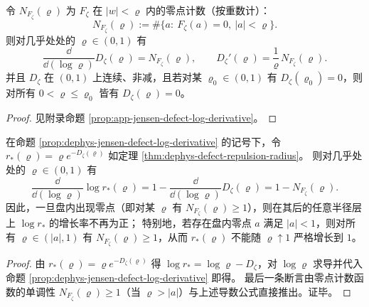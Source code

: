 \begin{proposition}\label{prop:dephys-jensen-defect-log-derivative}
令 \(N_{F_{\zeta}}(\varrho)\) 为 \(F_{\zeta}\) 在 \(|w|<\varrho\) 内的零点计数（按重数计）：
\[
N_{F_{\zeta}}(\varrho)
:=\#\bigl\{a:\ F_{\zeta}(a)=0,\ |a|<\varrho\bigr\}.
\]
则对几乎处处的 \(\varrho\in(0,1)\) 有
\[
\frac{\dd}{\dd(\log\varrho)}D_{\zeta}(\varrho)=N_{F_{\zeta}}(\varrho),
\qquad
D_{\zeta}'(\varrho)=\frac{1}{\varrho}\,N_{F_{\zeta}}(\varrho).
\]
并且 \(D_{\zeta}\) 在 \((0,1)\) 上连续、非减，且若对某 \(\varrho_0\in(0,1)\) 有 \(D_{\zeta}(\varrho_0)=0\)，则对所有 \(0<\varrho\le \varrho_0\) 皆有 \(D_{\zeta}(\varrho)=0\)。
\end{proposition}

\begin{proof}
见附录命题 \ref{prop:app-jensen-defect-log-derivative}。
\end{proof}

\begin{corollary}[排斥半径的零点计数驱动律]\label{cor:dephys-repulsion-radius-zero-count-driving}
在命题 \ref{prop:dephys-jensen-defect-log-derivative} 的记号下，令 \(r_{\ast}(\varrho)=\varrho e^{-D_{\zeta}(\varrho)}\) 如定理 \ref{thm:dephys-defect-repulsion-radius}。
则对几乎处处的 \(\varrho\in(0,1)\) 有
\[
\frac{\dd}{\dd(\log\varrho)}\log r_{\ast}(\varrho)
=1-\frac{\dd}{\dd(\log\varrho)}D_{\zeta}(\varrho)
=1-N_{F_{\zeta}}(\varrho).
\]
因此，一旦盘内出现零点（即对某 \(\varrho\) 有 \(N_{F_{\zeta}}(\varrho)\ge 1\)），则在其后的任意半径层上 \(\log r_{\ast}\) 的增长率不再为正；
特别地，若存在盘内零点 \(a\) 满足 \(|a|<1\)，则对所有 \(\varrho\in(|a|,1)\) 有 \(N_{F_{\zeta}}(\varrho)\ge 1\)，从而 \(r_{\ast}(\varrho)\) 不能随 \(\varrho\uparrow 1\) 严格增长到 \(1\)。
\end{corollary}

\begin{proof}
由 \(r_{\ast}(\varrho)=\varrho e^{-D_{\zeta}(\varrho)}\) 得 \(\log r_{\ast}=\log\varrho-D_{\zeta}\)，对 \(\log\varrho\) 求导并代入命题 \ref{prop:dephys-jensen-defect-log-derivative} 即得。
最后一条断言由零点计数函数的单调性 \(N_{F_{\zeta}}(\varrho)\ge 1\)（当 \(\varrho>|a|\)）与上述导数公式直接推出。证毕。
\end{proof}

